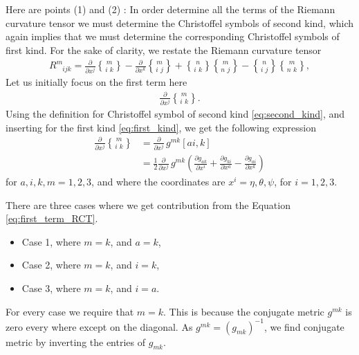 \documentclass[main.tex]{subfiles}
\begin{document}
\hspace{-6mm}Here are points (1) and (2) :
In order determine all the terms of the Riemann curvature tensor we must determine the Christoffel
symbols of second kind, which again implies that we must determine the corresponding Christoffel
symbols of first kind. For the sake of clarity, we restate the Riemann curvature tensor
\begin{align}
\label{eq:RCT_}
R^m_{\phantom{m}ijk} =  
\frac{\partial}{\partial x^j}{m \brace i\,\,k} - \frac{\partial}{\partial  x^k}{m \brace i\,\,j} 
+ {n \brace i\,\,k}{m \brace n\,\,j} - {n \brace i\,\,j}{m \brace n\,\,k},
\end{align}
Let us initially focus on the first term here
\begin{align}
 \frac{\partial}{\partial x^j}{m \brace i\,\,k}.
\end{align}
Using the definition for Christoffel symbol of second kind \eqref{eq:second_kind}, and inserting for 
the first kind \eqref{eq:first_kind}, we get the following expression
\begin{align}
 \frac{\partial}{\partial x^j}{m \brace i\,\,k} &=  \frac{\partial}{\partial x^j}\, g^{mk} 
 \left[a i,k\right]\\
\label{eq:first_term_RCT}
&= \frac{1}{2}\frac{\partial}{\partial x^j} \, g^{mk} \left(\frac{\partial g_{ak}}{\partial x^i} + 
\frac{\partial g_{ki}}{\partial x^a} - \frac{\partial g_{ai}}{\partial x^k}\right)
\end{align}
for $a,i,k,m = 1,2,3$, and where the coordinates are $x^i = \eta , \theta, \psi$, for $i = 1,2,3$.

There are three cases where we get contribution from the Equation \eqref{eq:first_term_RCT}.
\begin{itemize}
\item Case 1, where $m=k$, and $a=k$,
\item Case 2, where $m=k$, and $i=k$,
\item Case 3, where $m=k$, and $i=a$.
\end{itemize}
For every case we require that $m=k$. This is because the conjugate metric $g^{mk}$ is zero every
where except on the diagonal. As $g^{mk} = (g_{mk})^{-1}$, we find conjugate metric by 
inverting the entries of $g_{mk}$.
\end{document}
